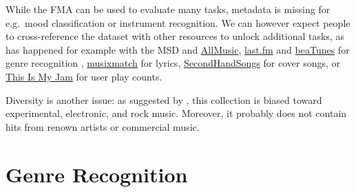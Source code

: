 \documentclass{article}
\begin{document}


While the FMA can be used to evaluate many tasks, metadata is missing for e.g.\ mood classification or instrument recognition.
We can however expect people to cross-reference the dataset with other resources to unlock additional tasks, as has happened for example with the MSD and \href{http://www.allmusic.com}{AllMusic}, \href{https://www.last.fm}{last.fm} and \href{https://beatunes.com}{beaTunes} for genre recognition \cite{msd_features, msd_genres}, \href{https://musixmatch.com}{musixmatch} for lyrics, \href{https://secondhandsongs.com}{SecondHandSongs} for cover songs, or \href{https://www.thisismyjam.com}{This Is My Jam} for user play counts.

Diversity is another issue: as suggested by , this collection is biased toward experimental, electronic, and rock music. Moreover, it probably does not contain hits from renown artists or commercial music.


\section{Genre Recognition} %
\end{document}
